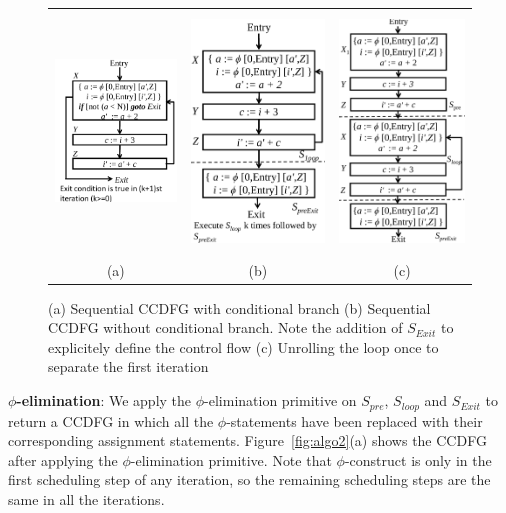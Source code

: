 \begin{figure}[t!]
\begin{center}
\begin{tabular}{ccc}
\includegraphics[height=1.6in]{fig-proposal/seq-ccdfg}
&
\includegraphics[height=2.5in]{fig-proposal/algorithm-after-removing-branches}
&
\includegraphics[height=2.5in]{fig-proposal/algorithm-two-iterations}
\\
(a) & (b) & (c)
\end{tabular}
\end{center}
\caption{(a) Sequential CCDFG with conditional branch (b) Sequential CCDFG without conditional branch. Note the addition of $S_{Exit}$ to explicitely define the control flow (c) Unrolling the loop once to separate the first iteration}
\label{fig:algo1}
\end{figure}

{\bf $\phi$-elimination}: We apply the $\phi$-elimination primitive on $S_{pre}$, $S_{loop}$ and $S_{Exit}$ to return a CCDFG in which all the $\phi$-statements have been replaced with their corresponding assignment statements. Figure~\ref{fig:algo2}(a) shows the CCDFG after applying the $\phi$-elimination primitive. Note that $\phi$-construct is only in the first scheduling step of any iteration, so the remaining scheduling steps are the same in all the iterations.


